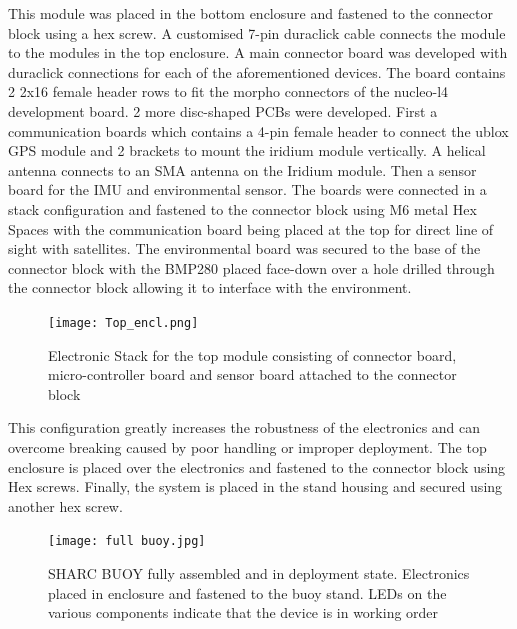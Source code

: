 This module was placed in the bottom enclosure and fastened to the connector block using a hex screw. A customised 7-pin duraclick cable connects the module to the modules in the top enclosure. A main connector board was developed with duraclick connections for each of the aforementioned devices. The board contains 2  2x16 female header rows to fit the morpho connectors of the nucleo-l4 development board. 2 more disc-shaped PCBs were developed. First a communication boards which contains a 4-pin female header to connect the ublox GPS module and 2 brackets to mount the iridium module vertically. A helical antenna connects to an SMA antenna on the Iridium module. Then a sensor board for the IMU and environmental sensor. The boards were connected in a stack configuration and fastened to the connector block using M6 metal Hex Spaces with the communication board being placed at the top for direct line of sight with satellites. The environmental board was secured to the base of the connector block with the BMP280 placed face-down over a hole drilled through the connector block allowing it to interface with the environment.
\begin{figure}[H]
	\centering
	\texttt{[image: Top\_encl.png]}
	\caption{Electronic Stack for the top module consisting of connector board, micro-controller board and sensor board attached to the connector block }
	\label{fig:top_elec}
\end{figure}

This configuration greatly increases the robustness of the electronics and can overcome breaking caused by poor handling or improper deployment.  The top enclosure is placed over the electronics and fastened to the connector block using Hex screws. Finally, the system is placed in the stand housing and secured using another hex screw.

\begin{figure}[H]
	\centering
	\texttt{[image: full buoy.jpg]}
	\caption{SHARC BUOY fully assembled and in deployment state. Electronics placed in enclosure and fastened to the buoy stand. LEDs on the various components indicate that the device is in working order}
	\label{fig:my_label}
\end{figure}
